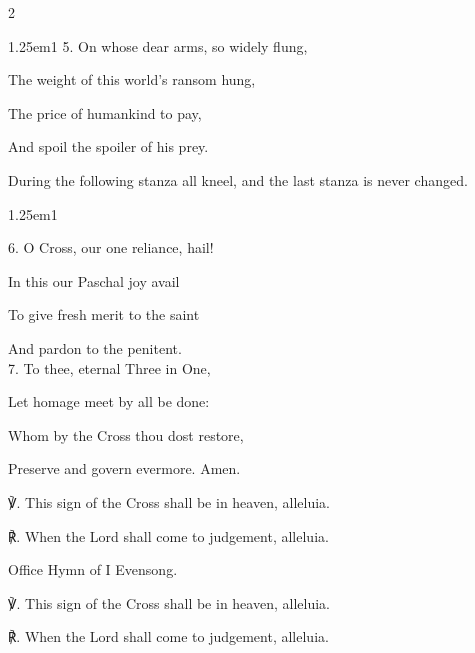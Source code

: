 \begin{paracol}{2}
\begin{hangparas}{1.25em}{1}
5. On whose dear arms, so widely flung,

The weight of this world’s ransom hung,

The price of humankind to pay,

And spoil the spoiler of his prey.
\end{hangparas}

\begin{rubric}
	During the following stanza all kneel, and the last stanza is never changed.
\end{rubric}

\begin{hangparas}{1.25em}{1}

6. O Cross, our one reliance, hail!

In this our Paschal joy avail

To give fresh merit to the saint

And pardon to the penitent.\\

7. To thee, eternal Three in One,

Let homage meet by all be done:

Whom by the Cross thou dost restore,

Preserve and govern evermore. Amen.\\
\end{hangparas}

℣. This sign of the Cross shall be in heaven, alleluia.

℟. When the Lord shall come to judgement, alleluia.



\secondEvensong
{}

\begin{rubric}
	Office Hymn of I Evensong.
\end{rubric}

℣. This sign of the Cross shall be in heaven, alleluia.

℟. When the Lord shall come to judgement, alleluia.




\end{paracol}
